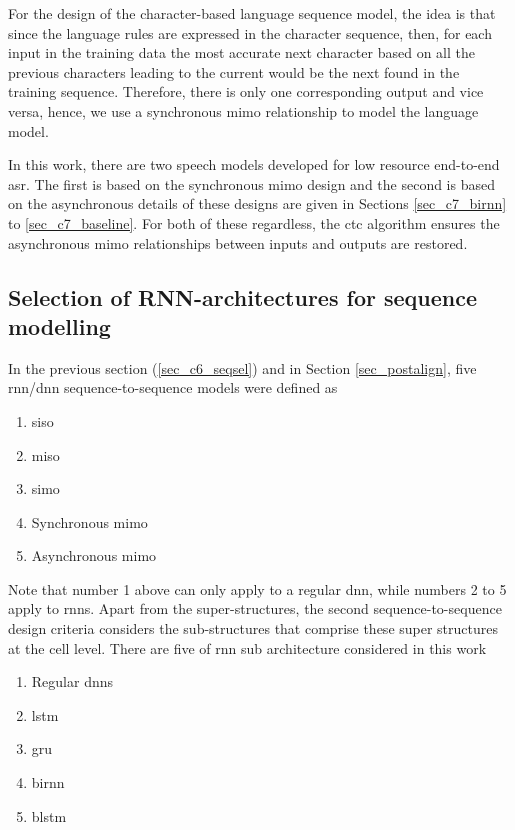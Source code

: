 For the design of the character-based language sequence model, the idea is that since the language rules are expressed in the character sequence, then, for each input in the training data the most accurate next character based on all the previous characters leading to the current would be the next found in the training sequence.  Therefore, there is only one corresponding output and vice versa, hence, we use a synchronous \acrshort{mimo} relationship to model the language model.

In this work, there are two speech models developed for low resource end-to-end \acrshort{asr}.  The first is based on the synchronous \acrshort{mimo} design and the second is based on the asynchronous details of these designs are given in Sections \ref{sec_c7_birnn} to \ref{sec_c7_baseline}. For both of these regardless, the \acrshort{ctc} algorithm ensures the asynchronous \acrshort{mimo} relationships between inputs and outputs are restored.

\subsection{Selection of RNN-architectures for sequence modelling}
In the previous section (\ref{sec_c6_seqsel}) and in Section \ref{sec_postalign}, five \acrshort{rnn}/\acrshort{dnn} sequence-to-sequence models were defined as 
\begin{enumerate}
    \item \acrfull{siso}
    \item \acrfull{miso}
    \item \acrfull{simo}
    \item Synchronous \acrfull{mimo}
    \item Asynchronous \acrfull{mimo}
\end{enumerate}

Note that number 1 above can only apply to a regular \acrshort{dnn}, while numbers 2 to 5  apply to \acrshort{rnn}s.  Apart from the super-structures, the second sequence-to-sequence design criteria considers the sub-structures that comprise these super structures at the cell level.  There are five of \acrshort{rnn} sub architecture considered in this work
\begin{enumerate}
    \item Regular \acrshort{dnn}s
    \item \acrfull{lstm}
    \item \acrfull{gru}
    \item \acrlong{birnn}
    \item \acrlong{blstm}
\end{enumerate}

